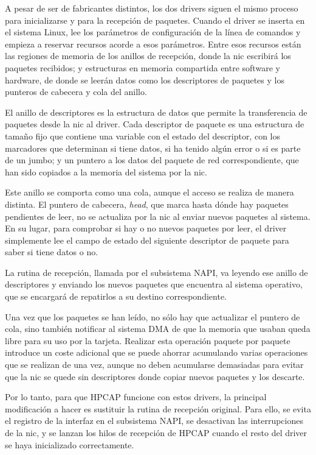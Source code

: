 \documentclass[oneside, draft]{epstfg}
\begin{document}
A pesar de ser de fabricantes distintos, los dos \glspl{driver} siguen el mismo proceso para inicializarse y para la recepción de paquetes. Cuando el \gls{driver} se inserta en el sistema Linux, lee los parámetros de configuración de la línea de comandos y empieza a reservar recursos acorde a esos parámetros. Entre esos recursos están las regiones de memoria de los anillos de recepción, donde la \gls{nic} escribirá los paquetes recibidos; y estructuras en memoria compartida entre software y hardware, de donde se leerán datos como los descriptores de paquetes y los punteros de cabecera y cola del anillo.

El anillo de descriptores es la estructura de datos que permite la transferencia de paquetes desde la \gls{nic} al \gls{driver}. Cada descriptor de paquete es una estructura de tamaño fijo que contiene una variable con el estado del descriptor, con los marcadores que determinan si tiene datos, si ha tenido algún error o si es parte de un \gls{jumbo}; y un puntero a los datos del paquete de red correspondiente, que han sido copiados a la memoria del sistema por la \gls{nic}.

Este anillo se comporta como una cola, aunque el acceso se realiza de manera distinta. El puntero de cabecera, \textit{head}, que marca hasta dónde hay paquetes pendientes de leer, no se actualiza por la \gls{nic} al enviar nuevos paquetes al sistema. En su lugar, para comprobar si hay o no nuevos paquetes por leer, el \gls{driver} simplemente lee el campo de estado del siguiente descriptor de paquete para saber si tiene datos o no.

La rutina de recepción, llamada por el subsistema \gls{NAPI}, va leyendo ese anillo de descriptores y enviando los nuevos paquetes que encuentra al sistema operativo, que se encargará de repatirlos a su destino correspondiente.

Una vez que los paquetes se han leído, no sólo hay que actualizar el puntero de cola, sino también notificar al sistema \gls{DMA} de que la memoria que usaban queda libre para su uso por la tarjeta. Realizar esta operación paquete por paquete introduce un coste adicional que se puede ahorrar acumulando varias operaciones que se realizan de una vez, aunque no deben acumularse demasiadas para evitar que la \gls{nic} se quede sin descriptores donde copiar nuevos paquetes y los descarte.

Por lo tanto, para que HPCAP funcione con estos \glspl{driver}, la principal modificación a hacer es sustituir la rutina de recepción original. Para ello, se evita el registro de la interfaz en el subsistema \gls{NAPI}, se desactivan las interrupciones de la \gls{nic}, y se lanzan los hilos de recepción de HPCAP cuando el resto del \gls{driver} se haya inicializado correctamente.
\end{document}
